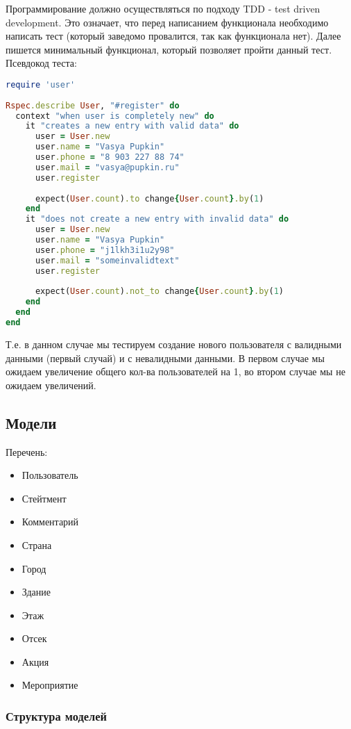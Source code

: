 \documentclass[DIV=calc, paper=a4, fontsize=11pt]{scrartcl} %
\begin{document}
Программирование должно осуществляться по подходу TDD - test driven development. Это означает, что перед написанием функционала необходимо написать тест (который заведомо провалится, так как функционала нет). Далее пишется минимальный функционал, который позволяет пройти данный тест.
\\[0.5cm]
Псевдокод теста:
\begin{lstlisting}[language=Ruby]
require 'user'
	
Rspec.describe User, "#register" do
  context "when user is completely new" do
	it "creates a new entry with valid data" do
	  user = User.new
      user.name = "Vasya Pupkin"
	  user.phone = "8 903 227 88 74"
	  user.mail = "vasya@pupkin.ru"
	  user.register
				
	  expect(User.count).to change{User.count}.by(1)
	end
    it "does not create a new entry with invalid data" do
      user = User.new
	  user.name = "Vasya Pupkin"
	  user.phone = "j1lkh3i1u2y98"
	  user.mail = "someinvalidtext"
	  user.register	
		
      expect(User.count).not_to change{User.count}.by(1)
	end
  end
end
\end{lstlisting}
Т.е. в данном случае мы тестируем создание нового пользователя с валидными данными (первый случай) и с невалидными данными. В первом случае мы ожидаем увеличение общего кол-ва пользователей на 1, во втором случае мы не ожидаем увеличений.



\subsection{Модели}
Перечень:

\begin{itemize}
	\item Пользователь
	\item Стейтмент
	\item Комментарий
	\item Страна
	\item Город
	\item Здание
	\item Этаж
	\item Отсек
	\item Акция
	\item Мероприятие
\end{itemize}

\subsubsection{Структура моделей}
\end{document}
